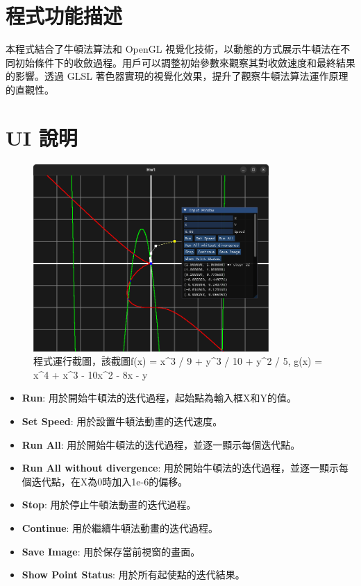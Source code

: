 \documentclass[a4paper,12pt]{article}
\begin{document}
\section{程式功能描述}
本程式結合了牛頓法算法和 OpenGL 視覺化技術，以動態的方式展示牛頓法在不同初始條件下的收斂過程。用戶可以調整初始參數來觀察其對收斂速度和最終結果的影響。透過 GLSL 著色器實現的視覺化效果，提升了觀察牛頓法算法運作原理的直觀性。

\section{UI 說明}
\begin{figure}[h]
    \centering
    \includegraphics[width=0.8\textwidth]{img/image.png}
    \caption{程式運行截圖，該截圖f(x) = x^3 / 9 + y^3 / 10 + y^2 / 5, g(x) = x^4 + x^3 - 10x^2 - 8x - y }
\end{figure}

\begin{itemize}
    \item \textbf{Run}: 用於開始牛頓法的迭代過程，起始點為輸入框X和Y的值。
    \item \textbf{Set Speed}: 用於設置牛頓法動畫的迭代速度。
    \item \textbf{Run All}: 用於開始牛頓法的迭代過程，並逐一顯示每個迭代點。
    \item \textbf{Run All without divergence}: 用於開始牛頓法的迭代過程，並逐一顯示每個迭代點，在X為0時加入1e-6的偏移。
    \item \textbf{Stop}: 用於停止牛頓法動畫的迭代過程。
    \item \textbf{Continue}: 用於繼續牛頓法動畫的迭代過程。
    \item \textbf{Save Image}: 用於保存當前視窗的畫面。
    \item \textbf{Show Point Status}: 用於所有起使點的迭代結果。
\end{itemize}
\end{document}
